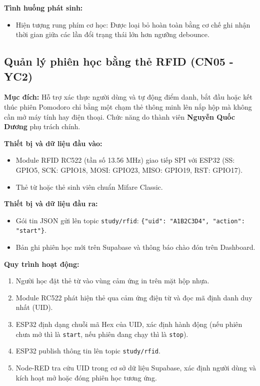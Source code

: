 \textbf{Tình huống phát sinh:}
\begin{itemize}
    \item Hiện tượng rung phím cơ học: Được loại bỏ hoàn toàn bằng cơ chế ghi nhận thời gian giữa các lần đổi trạng thái lớn hơn ngưỡng debounce.
\end{itemize}

\subsection{Quản lý phiên học bằng thẻ RFID (CN05 - YC2)}
\textbf{Mục đích:}
Hỗ trợ xác thực người dùng và tự động điểm danh, bắt đầu hoặc kết thúc phiên Pomodoro chỉ bằng một chạm thẻ thông minh lên nắp hộp mà không cần mở máy tính hay điện thoại. Chức năng do thành viên \textbf{Nguyễn Quốc Dương} phụ trách chính.

\textbf{Thiết bị và dữ liệu đầu vào:}
\begin{itemize}
    \item Module RFID RC522 (tần số 13.56 MHz) giao tiếp SPI với ESP32 (SS: GPIO5, SCK: GPIO18, MOSI: GPIO23, MISO: GPIO19, RST: GPIO17).
    \item Thẻ từ hoặc thẻ sinh viên chuẩn Mifare Classic.
\end{itemize}

\textbf{Thiết bị và dữ liệu đầu ra:}
\begin{itemize}
    \item Gói tin JSON gửi lên topic \texttt{study/rfid}: \texttt{\{"uid": "A1B2C3D4", "action": "start"\}}.
    \item Bản ghi phiên học mới trên Supabase và thông báo chào đón trên Dashboard.
\end{itemize}

\textbf{Quy trình hoạt động:}
\begin{enumerate}
    \item Người học đặt thẻ từ vào vùng cảm ứng in trên mặt hộp nhựa.
    \item Module RC522 phát hiện thẻ qua cảm ứng điện từ và đọc mã định danh duy nhất (UID).
    \item ESP32 định dạng chuỗi mã Hex của UID, xác định hành động (nếu phiên chưa mở thì là \texttt{start}, nếu phiên đang chạy thì là \texttt{stop}).
    \item ESP32 publish thông tin lên topic \texttt{study/rfid}.
    \item Node-RED tra cứu UID trong cơ sở dữ liệu Supabase, xác định người dùng và kích hoạt mở hoặc đóng phiên học tương ứng.
\end{enumerate}

